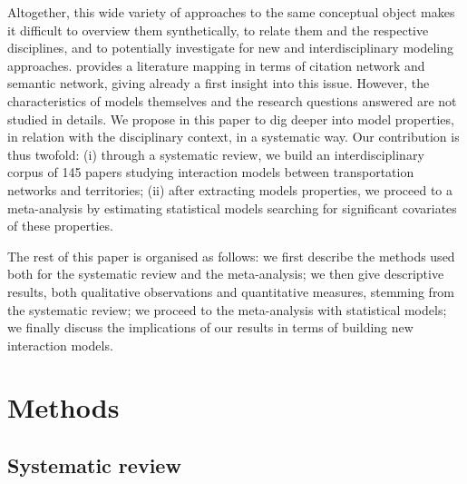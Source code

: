 \documentclass[10pt]{article}
\begin{document}

Altogether, this wide variety of approaches to the same conceptual object makes it difficult to overview them synthetically, to relate them and the respective disciplines, and to potentially investigate for new and interdisciplinary modeling approaches. \cite{raimbault2018caracterisation} provides a literature mapping in terms of citation network and semantic network, giving already a first insight into this issue. However, the characteristics of models themselves and the research questions answered are not studied in details. We propose in this paper to dig deeper into model properties, in relation with the disciplinary context, in a systematic way. Our contribution is thus twofold: (i) through a systematic review, we build an interdisciplinary corpus of 145 papers studying interaction models between transportation networks and territories; (ii) after extracting models properties, we proceed to a meta-analysis by estimating statistical models searching for significant covariates of these properties.

The rest of this paper is organised as follows: we first describe the methods used both for the systematic review and the meta-analysis; we then give descriptive results, both qualitative observations and quantitative measures, stemming from the systematic review; we proceed to the meta-analysis with statistical models; we finally discuss the implications of our results in terms of building new interaction models.


\section{Methods}

\subsection{Systematic review}
\end{document}
